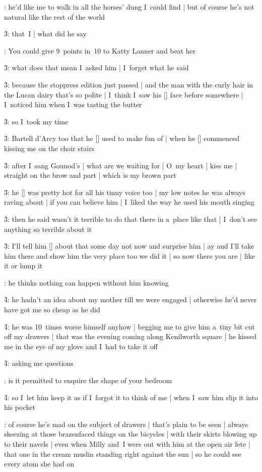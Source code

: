 :
he'd like me to walk in all the horses' dung I~could find |
but of course he's not natural like the rest of the world

\f3:
that~I |
what did he say

:
You could give 9~points in~10 to Katty Lanner and beat her

\f3:
what does that mean I~asked him |
I~forget what he said

\f3:
because the stoppress edition just passed |
and the man with the curly hair in the Lucan dairy that's so polite |
I~think I~saw his [\lucan] face before somewhere |
I~noticed him when I~was tasting the butter

\f3:
so I~took my time

\f3:
Bartell d'Arcy too that he [\bloom] used to make fun of |
when he [\dArcy] commenced kissing me on the choir stairs

\f3:
after I~sang Gounod's  |
what are we waiting for |
O~my heart |
kiss me |
straight on the brow and part |
which is my brown part

\f3:
he [\dArcy] was pretty hot for all his tinny voice too |
my low notes he was always raving about |
if you can believe him |
I~liked the way he used his mouth singing

\f3:
then he said wasn't it terrible to do that there in a~place like that |
I~don't see anything so terrible about it

\f3:
I'll tell him [\bloom] about that some day not now and surprise him |
ay and I'll take him there and show him the very place too we did it |
so now there you are |
like it or lump it

:
he thinks nothing can happen without him knowing

\f4:
he hadn't an idea about my mother till we were engaged |
otherwise he'd never have got me so cheap as he did

\f4:
he was 10~times worse himself anyhow |
begging me to give him a~tiny bit cut off my drawers |
that was the evening coming along Kenilworth square |
he kissed me in the eye of my glove and I~had to take it off

\f4:
asking me questions

:
is it permitted to enquire the shape of your bedroom

\f4:
so I~let him keep it as if I~forgot it to think of me |
when I~saw him slip it into his pocket

:
of course he's mad on the subject of drawers |
that's plain to be seen |
always skeezing at those brazenfaced things on the bicycles |
with their skirts blowing up to their navels |
even when Milly and~I were out with him at the open air fete |
that one in the cream muslin standing right against the sun |
so he could see every atom she had on

